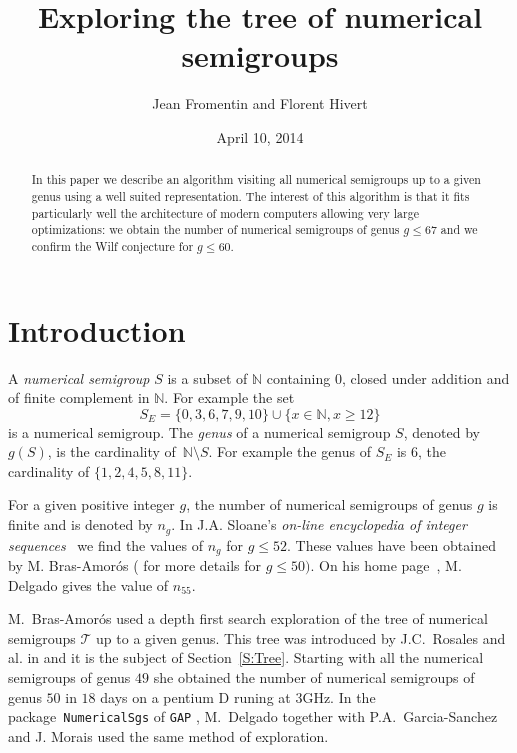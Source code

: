 \documentclass[reqno]{amsart}
\title{Exploring the tree of numerical semigroups}
\author{Jean Fromentin and  Florent Hivert}
\date{April 10,  2014}
\theoremstyle{plain}
\theoremstyle{definition}
\renewcommand{\leq}{\leqslant}
\renewcommand{\geq}{\geqslant}
\newcommand{\NN}{\mathbb{N}}
\renewcommand{\tt}[1]{\texttt{#1}}
\begin{document}
\maketitle

\begin{abstract}
  In this paper we describe an algorithm visiting all numerical semigroups
  up to a given genus using a well suited representation. The
  interest of this algorithm is that it fits particularly well the
  architecture of modern computers allowing very large optimizations: we obtain the number of numerical semigroups of genus $g\leq  67$ and we confirm the Wilf conjecture for $g\leq 60$.
  
\end{abstract}

\vspace{1em}

\section*{Introduction}

A \emph{numerical semigroup} $S$ is a subset of $\NN$ containing $0$, closed under addition and of finite complement in $\NN$.  
For example the set 
\begin{equation}
\label{E:NSG}
S_E=\{0,3,6,7,9,10\}\cup\{x\in\NN, x\geq 12\}
\end{equation}
is a numerical semigroup.
The \emph{genus} of a numerical semigroup $S$, denoted by~$g(S)$, is the cardinality of~$\NN\setminus S$.
 For example the genus of $S_E$ is $6$,  the cardinality of $\{1,2,4,5,8,11\}$.

For a given positive integer $g$, the number of numerical semigroups of genus $g$ is finite and is denoted by $n_g$. 
In  J.A. Sloane's \emph{on-line encyclopedia of integer sequences}~\cite{OEIS} we find the values of $n_g$ for $g\leq 52$. 
These values have been obtained by M. Bras-Amor\'os (\cite{BrasAmoros2008} for more details for $g\leq 50)$. 
On his home page~\cite{Delgado}, M. Delgado  gives the value of $n_{55}$. 


M.~Bras-Amor\'os used a depth first search exploration of the tree of numerical semigroups $\mathcal{T}$ up to a given genus.
This tree was introduced by J.C.~Rosales and al. in \cite{Rosales} and it is the subject of Section~\ref{S:Tree}.
Starting with all the numerical semigroups of genus $49$ she obtained the number of numerical semigroups of genus $50$ in $18$ days on a pentium D runing at $3$GHz. 
In the package~\tt{NumericalSgs} \cite{NumericalSgps} of \tt{GAP} \cite{GAP}, M.~Delgado together with P.A.~Garcia-Sanchez and J. Morais used the same method of exploration.
\end{document}
